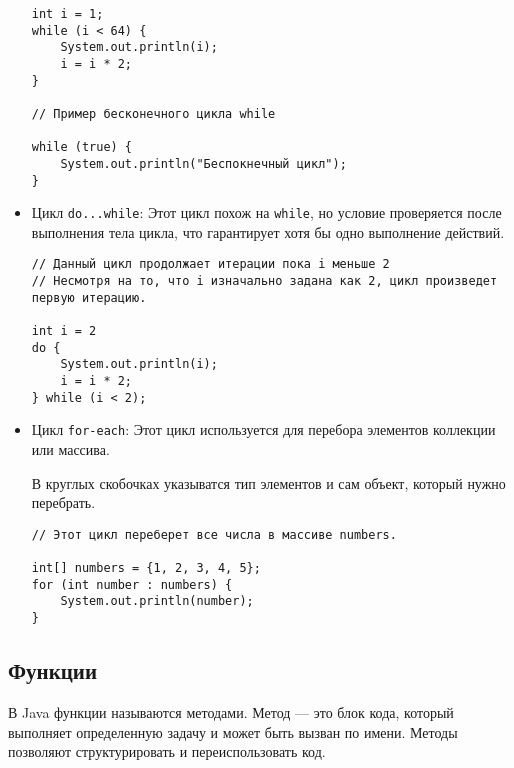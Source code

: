\begin{itemize}
\begin{verbatim}
int i = 1;
while (i < 64) {
    System.out.println(i);
    i = i * 2;
}

// Пример бесконечного цикла while

while (true) {
    System.out.println("Беспокнечный цикл");
}
    \end{verbatim}
    \vspace{0.4cm}


    \item Цикл \texttt{do...while}: Этот цикл похож на \texttt{while}, но условие проверяется после выполнения тела цикла, что гарантирует хотя бы одно выполнение действий.

    \begin{verbatim}
// Данный цикл продолжает итерации пока i меньше 2
// Несмотря на то, что i изначально задана как 2, цикл произведет первую итерацию.

int i = 2
do {
    System.out.println(i);
    i = i * 2;
} while (i < 2);
    \end{verbatim}
    \vspace{0.4cm}

    
    \item Цикл \texttt{for-each}: Этот цикл используется для перебора элементов коллекции или массива.\par
    В круглых скобочках указыватся тип элементов и сам объект, который нужно перебрать.

    \begin{verbatim}
// Этот цикл переберет все числа в массиве numbers.

int[] numbers = {1, 2, 3, 4, 5};
for (int number : numbers) {
    System.out.println(number);
}
    \end{verbatim}
\end{itemize}


\subsection{Функции}
В Java функции называются методами. Метод — это блок кода, который выполняет определенную задачу и может быть вызван по имени. Методы позволяют структурировать и переиспользовать код.


